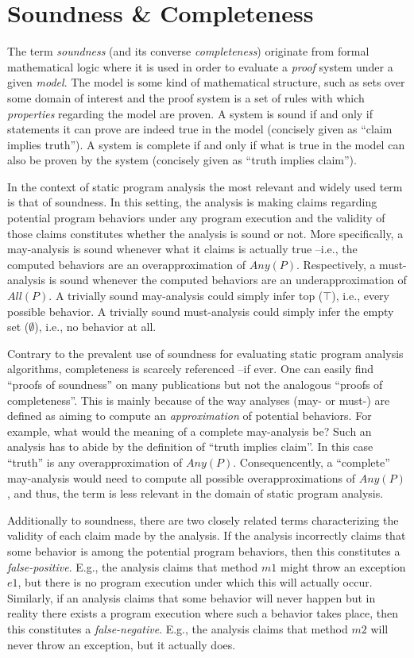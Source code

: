 \section{Soundness \& Completeness}

The term \emph{soundness} (and its converse \emph{completeness}) originate from formal mathematical logic where it is used in order to evaluate a \emph{proof} system under a given \emph{model}. The model is some kind of mathematical structure, such as sets over some domain of interest and the proof system is a set of rules with which \emph{properties} regarding the model are proven. A system is sound if and only if statements it can prove are indeed true in the model (concisely given as ``claim implies truth''). A system is complete if and only if what is true in the model can also be proven by the system (concisely given as ``truth implies claim'').

In the context of static program analysis the most relevant and widely used term is that of soundness. In this setting, the analysis is making claims regarding potential program behaviors under any program execution and the validity of those claims constitutes whether the analysis is sound or not. More specifically, a may-analysis is sound whenever what it claims is actually true --i.e., the computed behaviors are an overapproximation of $Any(P)$. Respectively, a must-analysis is sound whenever the computed behaviors are an underapproximation of $All(P)$. A trivially sound may-analysis could simply infer top ($\top$), i.e., every possible behavior. A trivially sound must-analysis could simply infer the empty set ($\emptyset$), i.e., no behavior at all.

Contrary to the prevalent use of soundness for evaluating static program analysis algorithms, completeness is scarcely referenced --if ever. One can easily find ``proofs of soundness'' on many publications but not the analogous ``proofs of completeness''. This is mainly because of the way analyses (may- or must-) are defined as aiming to compute an \emph{approximation} of potential behaviors. For example, what would the meaning of a complete may-analysis be? Such an analysis has to abide by the definition of ``truth implies claim''. In this case ``truth'' is any overapproximation of $Any(P)$. Consequencently, a ``complete'' may-analysis would need to compute all possible overapproximations of $Any(P)$, and thus, the term is less relevant in the domain of static program analysis.

Additionally to soundness, there are two closely related terms characterizing the validity of each claim made by the analysis. If the analysis incorrectly claims that some behavior is among the potential program behaviors, then this constitutes a \emph{false-positive}. E.g., the analysis claims that method $m1$ might throw an exception $e1$, but there is no program execution under which this will actually occur. Similarly, if an analysis claims that some behavior will never happen but in reality there exists a program execution where such a behavior takes place, then this constitutes a \emph{false-negative}. E.g., the analysis claims that method $m2$ will never throw an exception, but it actually does.

